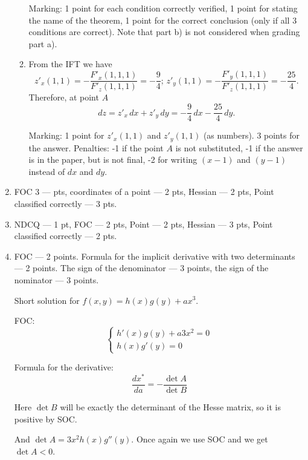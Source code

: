 \begin{enumerate}
\begin{enumerate}
        Marking: 1 point for each condition correctly verified, 1 point for stating the name of the theorem, 
        1 point for the correct conclusion (only if all 3 conditions are correct). 
        Note that part b) is not considered when grading part a).
        
        \item From the IFT we have 
        \[
        z'_x(1,1)=-\frac{F'_x(1,1,1)}{F'_z(1,1,1)}=-\frac94;\, z'_y(1,1)=-\frac{F'_y(1,1,1)}{F'_z(1,1,1)}=-\frac{25}{4}.
        \]
        Therefore, at point $A$
        \[
        dz=z'_x\,dx+z'_y\,dy=-\frac94\,dx-\frac{25}{4}\,dy.
        \]
        
        Marking: 1 point for $z'_x(1,1)$ and $z'_y(1,1)$ (as numbers). 3 points for the answer. 
        Penalties: -1 if the point $A$ is not substituted, -1 if the answer is in the paper, but is not final, 
        -2 for writing $(x-1)$ and $(y-1)$ instead of $dx$ and $dy$.
        
        
        
        
    \end{enumerate}

        \item FOC 3 — pts, coordinates of a point — 2 pts, Hessian  — 2 pts, Point classified correctly — 3 pts.

        \item NDCQ — 1 pt, FOC — 2 pts, Point — 2 pts, Hessian — 3 pts, Point classified correctly — 2 pts.

        \item FOC — 2 points. Formula for the implicit derivative with two determinants — 2 points. 
        The sign of the denominator — 3 points, the sign of the nominator — 3 points.
        
        Short solution for $f(x,y) = h(x)g(y) + ax^3$.
        
        FOC:
        \[
        \begin{cases}
        h'(x)g(y) + a 3x^2 = 0 \\
        h(x)g'(y) = 0
        \end{cases}
        \]
        
        Formula for the derivative:
        \[
        \frac{dx^*}{da} = - \frac{\det A}{\det B}
        \]
        
        Here $\det B$ will be exactly the determinant of the Hesse matrix, so it is positive by SOC.
        
        And $\det A = 3x^2 h(x) g''(y)$. Once again we use SOC and we get $\det A < 0$.
        

\end{enumerate}
